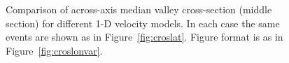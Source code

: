 \documentclass[jgrga]{agu2001} %
\renewcommand{\includefig}[2]{}
\begin{document}
\begin{figure}

\includefig{cros/cros-2-jhd-mva-obh10}{30pc} %

\includefig{cros/cros-2-jhd-pro109kmvel}{30pc} %

\includefig{cros/cros-2-inv-mva-obh10}{30pc} %

\caption{Comparison of across-axis median valley cross-section (middle
section) for different 1-D velocity
models.  In each case the same events are shown as in
Figure~\ref{fig:croslat}.  Figure format is as in Figure~\ref{fig:croslonvar}.}
\label{fig:croslatvar}
\end{figure}
\end{document}
